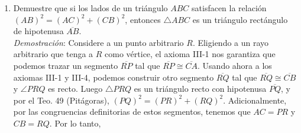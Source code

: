 \documentclass[12pt]{article}
\begin{document}
\begin{enumerate}
{\it Demostración}: Note primero que $\angle ADC \cong \angle ACB$, al ambos ser rectos (Teo. 9). Luego, por el Teorema 39, $\angle A + \angle B = 90^{\circ} \hspace{3 pt}\wedge\hspace{3 pt} \angle A + \angle ACD = 90^{\circ} \implies \angle ACD \cong \angle B$. Similarmente, $\angle CDB \cong \angle ACB$, así que $\angle B + \angle A = 90^{\circ} \hspace{3 pt}\wedge\hspace{3 pt} \angle B + \angle BCD = 90^{\circ} \implies \angle A \cong \angle BCD$. Luego, existe una correspondencia entre los vértices de $\bigtriangleup ACD$ y $\bigtriangleup CBD$, $A \leftrightarrow C$, $C \leftrightarrow B$ y $D \leftrightarrow D$, tal que los ángulos internos correspondientes a estos vértices en sus respectivos triángulos son congruentes entre sí. Por lo tanto, aplicando al Teo. 45 (AAA), $\bigtriangleup ACD \sim \bigtriangleup CBD$ y, por definición de semejanza de triángulos,

\begin{center}
$\begin{array}{@{\hskip 0 in}lll}
\frac{AC}{CB} = \frac{CD}{BD} = \frac {DA}{DC} & \implies & \frac{CD}{DB} = \frac{AD}{CD} \\
& \\
							       & \implies & \frac{(CD)^2}{DB} = AD \\
& \\
							       & \implies & (CD)^2 = AD \times DB \quad\quad\qed \\
\end{array}$
\end{center}


\item Demuestre que si los lados de un triángulo $ABC$ satisfacen la relación $(AB)^2 = (AC)^2 + (CB)^2$, entonces $\bigtriangleup ABC$ es un triángulo rectángulo de hipotenusa $\overline{AB}$. \\

{\it Demostración}: Considere a un punto arbitrario $R$. Eligiendo a un rayo arbitrario que tenga a $R$ como vértice, el axioma III-1 nos garantiza que podemos trazar un segmento $\overline{RP}$ tal que $\overline{RP} \cong \overline{CA}$. Usando ahora a los axiomas III-1 y III-4, podemos construir otro segmento $\overline{RQ}$ tal que $\overline{RQ} \cong \overline{CB}$ y $\angle PRQ$ es recto. Luego $\bigtriangleup PRQ$ es un triángulo recto con hipotenusa $\overline{PQ}$, y por el Teo. 49 (Pitágoras), $(PQ)^2 = (PR)^2 + (RQ)^2$. Adicionalmente, por las congruencias definitorias de estos segmentos, tenemos que $AC = PR$ y $CB = RQ$. Por lo tanto,


\end{enumerate}
\end{document}
